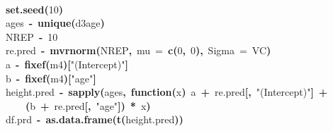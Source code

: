 \documentclass{article}
\makeatletter
\newcommand{\hlnumber}[1]{\textcolor[rgb]{0,0,0}{#1}}%
\newcommand{\hlfunctioncall}[1]{\textcolor[rgb]{.5,0,.33}{\textbf{#1}}}%
\newcommand{\hlstring}[1]{\textcolor[rgb]{.6,.6,1}{#1}}%
\newcommand{\hlkeyword}[1]{\textbf{#1}}%
\newcommand{\hlargument}[1]{\textcolor[rgb]{.69,.25,.02}{#1}}%
\newcommand{\hlformalargs}[1]{\hlargument{#1}}%
\newcommand{\hlassignement}[1]{\textbf{#1}}%
\newcommand{\hlsymbol}[1]{#1}%
\newcommand{\hlstd}[1]{\textcolor[rgb]{0,0,0}{#1}}%
\newenvironment{kframe}{%
 \def\FrameCommand##1{\hskip\@totalleftmargin \hskip-\fboxsep
 \colorbox{shadecolor}{##1}\hskip-\fboxsep
     \hskip-\linewidth \hskip-\@totalleftmargin \hskip\columnwidth}%
 \MakeFramed {\advance\hsize-\width
   \@totalleftmargin\z@ \linewidth\hsize
   \@setminipage}}%
 {\par\unskip\endMakeFramed}
\newenvironment{knitrout}{}{} %
\makeatother
\begin{document}
\begin{knitrout}
{\begin{kframe}
\begin{flushleft}
\hlstd{}\hspace*{\fill}\\
\hlstd{}\hlfunctioncall{set.seed}\hlkeyword{(}\hlnumber{10}\hlkeyword{)}\hspace*{\fill}\\
\hlstd{}\hlsymbol{ages}{\ }\hlassignement{\usebox{\hlnormalsizeboxlessthan}-}{\ }\hlfunctioncall{unique}\hlkeyword{(}\hlsymbol{d3}\hlkeyword{\usebox{\hlnormalsizeboxdollar}}\hlsymbol{age}\hlkeyword{)}\hspace*{\fill}\\
\hlstd{}\hlsymbol{NREP}{\ }\hlassignement{\usebox{\hlnormalsizeboxlessthan}-}{\ }\hlnumber{10}\hspace*{\fill}\\
\hlstd{}\hlsymbol{re.pred}{\ }\hlassignement{\usebox{\hlnormalsizeboxlessthan}-}{\ }\hlfunctioncall{mvrnorm}\hlkeyword{(}\hlsymbol{NREP}\hlkeyword{,}{\ }\hlargument{mu}{\ }\hlargument{=}{\ }\hlfunctioncall{c}\hlkeyword{(}\hlnumber{0}\hlkeyword{,}{\ }\hlnumber{0}\hlkeyword{)}\hlkeyword{,}{\ }\hlargument{Sigma}{\ }\hlargument{=}{\ }\hlsymbol{VC}\hlkeyword{)}\hspace*{\fill}\\
\hlstd{}\hlsymbol{a}{\ }\hlassignement{\usebox{\hlnormalsizeboxlessthan}-}{\ }\hlfunctioncall{fixef}\hlkeyword{(}\hlsymbol{m4}\hlkeyword{)}\hlkeyword{[}\hlstring{"{}(Intercept)"{}}\hlkeyword{]}\hspace*{\fill}\\
\hlstd{}\hlsymbol{b}{\ }\hlassignement{\usebox{\hlnormalsizeboxlessthan}-}{\ }\hlfunctioncall{fixef}\hlkeyword{(}\hlsymbol{m4}\hlkeyword{)}\hlkeyword{[}\hlstring{"{}age"{}}\hlkeyword{]}\hspace*{\fill}\\
\hlstd{}\hlsymbol{height.pred}{\ }\hlassignement{\usebox{\hlnormalsizeboxlessthan}-}{\ }\hlfunctioncall{sapply}\hlkeyword{(}\hlsymbol{ages}\hlkeyword{,}{\ }\hlkeyword{function}\hlkeyword{(}\hlformalargs{x}\hlkeyword{)}{\ }\hlsymbol{a}{\ }\hlkeyword{+}{\ }\hlsymbol{re.pred}\hlkeyword{[}\hlkeyword{,}{\ }\hlstring{"{}(Intercept)"{}}\hlkeyword{]}{\ }\hlkeyword{+}\hspace*{\fill}\\
\hlstd{}{\ }{\ }{\ }{\ }\hlkeyword{(}\hlsymbol{b}{\ }\hlkeyword{+}{\ }\hlsymbol{re.pred}\hlkeyword{[}\hlkeyword{,}{\ }\hlstring{"{}age"{}}\hlkeyword{]}\hlkeyword{)}{\ }\hlkeyword{*}{\ }\hlsymbol{x}\hlkeyword{)}\hspace*{\fill}\\
\hlstd{}\hlsymbol{df.prd}{\ }\hlassignement{\usebox{\hlnormalsizeboxlessthan}-}{\ }\hlfunctioncall{as.data.frame}\hlkeyword{(}\hlfunctioncall{t}\hlkeyword{(}\hlsymbol{height.pred}\hlkeyword{)}\hlkeyword{)}\hspace*{\fill}\\

\end{flushleft}
\end{kframe}}
\end{knitrout}
\end{document}
